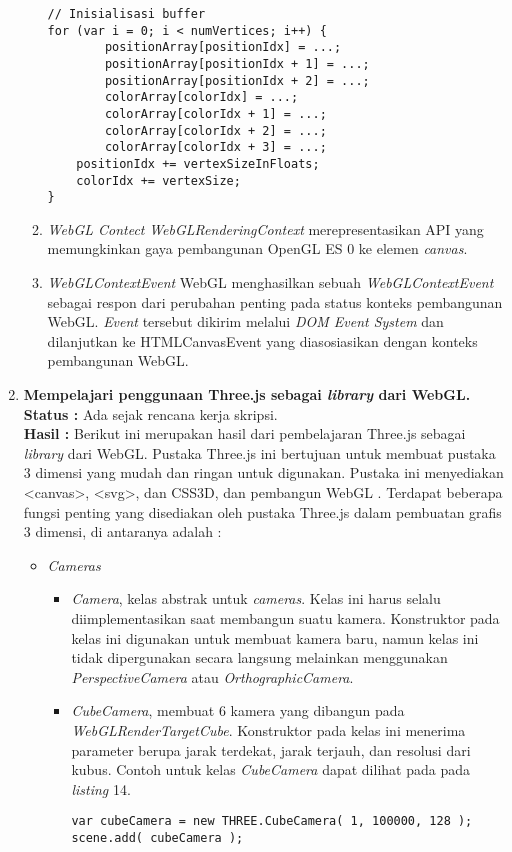 \documentclass[a4paper,twoside]{article}
\begin{document}
\begin{enumerate}
\begin{enumerate}
\begin{lstlisting}[caption={Transfer data ke implementasi WebGL.}, captionpos=b]
// Inisialisasi buffer
for (var i = 0; i < numVertices; i++) {
    	positionArray[positionIdx] = ...;
    	positionArray[positionIdx + 1] = ...;
    	positionArray[positionIdx + 2] = ...;
    	colorArray[colorIdx] = ...;
    	colorArray[colorIdx + 1] = ...;
    	colorArray[colorIdx + 2] = ...;
    	colorArray[colorIdx + 3] = ...;
   	positionIdx += vertexSizeInFloats;
   	colorIdx += vertexSize;
}
\end{lstlisting}
	
\item {\it WebGL Contect}
	{\it WebGLRenderingContext} merepresentasikan API yang memungkinkan gaya pembangunan OpenGL ES 0 ke elemen {\it canvas}.

\item {\it WebGLContextEvent}
	WebGL menghasilkan sebuah {\it WebGLContextEvent} sebagai respon dari perubahan penting pada status konteks pembangunan WebGL. {\it Event} tersebut dikirim melalui {\it DOM Event System} dan dilanjutkan ke HTMLCanvasEvent yang diasosiasikan dengan konteks pembangunan WebGL.

\end{enumerate}
		
		\item \textbf{Mempelajari penggunaan Three.js sebagai \textit{\textbf{library}} dari WebGL.}\\
		{\bf Status :} Ada sejak rencana kerja skripsi.\\
		{\bf Hasil :} Berikut ini merupakan hasil dari pembelajaran Three.js sebagai \textit{library} dari WebGL.
Pustaka Three.js ini bertujuan untuk membuat pustaka 3 dimensi yang mudah dan ringan untuk digunakan. Pustaka ini menyediakan <canvas>, <svg>, dan CSS3D, dan pembangun WebGL \cite{githubthreejs}.
Terdapat beberapa fungsi penting yang disediakan oleh pustaka Three.js dalam pembuatan grafis 3 dimensi, di antaranya adalah \cite{threejs}:
\begin{itemize}

\item \textit{Cameras}

	\begin{itemize}
	\item {\it Camera}, kelas abstrak untuk {\it cameras}. Kelas ini harus selalu diimplementasikan saat membangun suatu kamera. Konstruktor pada kelas ini digunakan untuk membuat kamera baru, namun kelas ini tidak dipergunakan secara langsung melainkan menggunakan {\it PerspectiveCamera} atau {\it OrthographicCamera}.
	
	\item {\it CubeCamera}, membuat 6 kamera yang dibangun pada {\it WebGLRenderTargetCube}. Konstruktor pada kelas ini menerima parameter berupa jarak terdekat, jarak terjauh, dan resolusi dari kubus. Contoh untuk kelas {\it CubeCamera} dapat dilihat pada pada {\it listing} 14.
	\begin{lstlisting}[caption={Contoh instansiasi kelas {\it CubeCamera}.},captionpos=b]
var cubeCamera = new THREE.CubeCamera( 1, 100000, 128 );
scene.add( cubeCamera );
\end{lstlisting}
	

\end{itemize}
\end{itemize}
\end{enumerate}
\end{document}
